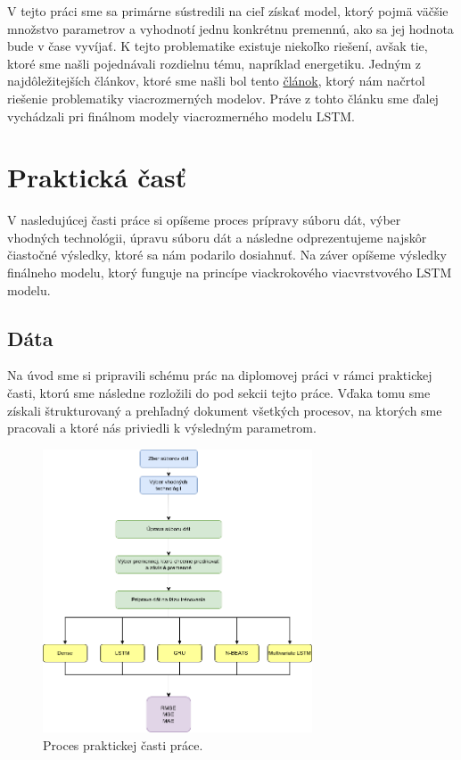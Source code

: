 V tejto práci sme sa primárne sústredili na cieľ získať model, ktorý pojmä väčšie množstvo parametrov a vyhodnotí jednu konkrétnu premennú, ako sa jej hodnota bude v čase vyvíjať. K tejto problematike existuje niekoľko riešení, avšak tie, ktoré sme našli pojednávali rozdielnu tému, napríklad energetiku. Jedným z najdôležitejších článkov, ktoré sme našli bol tento \href{https://machinelearningmastery.com/multivariate-time-series-forecasting-lstms-keras/}{článok}, ktorý nám načrtol riešenie problematiky viacrozmerných modelov. Práve z tohto článku sme ďalej vychádzali pri finálnom modely viacrozmerného modelu LSTM.

\section{Praktická časť}
V nasledujúcej časti práce si opíšeme proces prípravy súboru dát, výber vhodných technológii, úpravu súboru dát a následne odprezentujeme najskôr čiastočné výsledky, ktoré sa nám podarilo dosiahnuť. Na záver opíšeme výsledky finálneho modelu, ktorý funguje na princípe viackrokového viacvrstvového LSTM modelu.

\subsection{Dáta}
Na úvod sme si pripravili schému prác na diplomovej práci v rámci praktickej časti, ktorú sme následne rozložili do pod sekcii tejto práce. Vďaka tomu sme získali štrukturovaný a prehľadný dokument všetkých procesov, na ktorých sme pracovali a ktoré nás priviedli k výsledným parametrom.

\begin{figure}[!htbp]
  \centering
  \includegraphics[width=8cm]{img/multivariate LSTM Diagram.drawio (1).png}
  \caption{Proces praktickej časti práce.}
  \label{workflow}
\end{figure}

